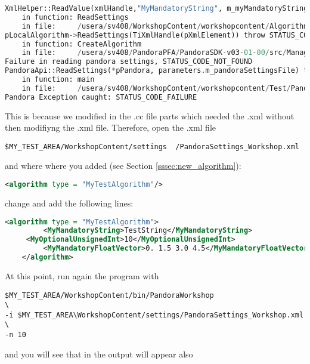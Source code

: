 \begin{lstlisting}[language=Basic, caption=Python example]
XmlHelper::ReadValue(xmlHandle,"MyMandatoryString", m_myMandatoryString) return STATUS_CODE_NOT_FOUND
    in function: ReadSettings
    in file:     /usera/sv408/WorkshopContent/workshopcontent/Algorithms/MyTestAlgorithm.cc line#: 46
pLocalAlgorithm->ReadSettings(TiXmlHandle(pXmlElement)) throw STATUS_CODE_NOT_FOUND
    in function: CreateAlgorithm
    in file:     /usera/sv408/PandoraPFA/PandoraSDK-v03-01-00/src/Managers/AlgorithmManager.cc line#: 135
Failure in reading pandora settings, STATUS_CODE_NOT_FOUND
PandoraApi::ReadSettings(*pPandora, parameters.m_pandoraSettingsFile) throw STATUS_CODE_FAILURE
    in function: main
    in file:     /usera/sv408/WorkshopContent/workshopcontent/Test/PandoraWorkshop.cc line#: 88
Pandora Exception caught: STATUS_CODE_FAILURE
\end{lstlisting}

This is because we modified in the .cc file parts which needed the .xml without then modifiyng the .xml file. Therefore, open the .xml file 

\begin{verbatim}
$MY_TEST_AREA/WorkshopContent/settings	/PandoraSettings_Workshop.xml
\end{verbatim}

and where where you added (see Section \ref{sssec:new_algorithm}):

\begin{lstlisting}[language=XML]
  <algorithm type = "MyTestAlgorithm"/>
\end{lstlisting}

change and add the following lines:

\begin{lstlisting}[language=XML, caption=XML example]
   <algorithm type = "MyTestAlgorithm">
         <MyMandatoryString>TestString</MyMandatoryString>
	 <MyOptionalUnsignedInt>10</MyOptionalUnsignedInt>
         <MyMandatoryFloatVector>0. 1.5 3.0 4.5</MyMandatoryFloatVector>
    </algorithm>
\end{lstlisting}

At this point, run again the program with 
\begin{verbatim}
$MY_TEST_AREA/WorkshopContent/bin/PandoraWorkshop                      \
-i $MY_TEST_AREA\WorkshopContent/settings/PandoraSettings_Workshop.xml \
-n 10
\end{verbatim}

and you will see that in the output will appear also

